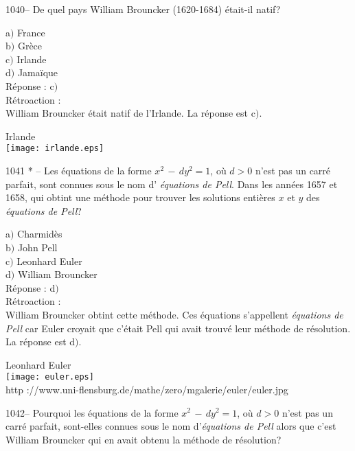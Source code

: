 ﻿\documentclass[letterpaper, 12pt]{article}
\begin{document}
1040-- De quel pays William Brouncker (1620-1684) \'etait-il natif?

a$)$ France  \\
b$)$ Gr\`ece  \\
c$)$ Irlande \\
d$)$ Jama\"ique\\

R\'eponse : c$)$\\

R\'etroaction : \\
William Brouncker \'etait natif de l'Irlande.
La r\'eponse est c$)$.\\
        \begin{center}
        Irlande\\
    \texttt{[image: irlande.eps]}\\
    \end{center}

1041 * -- Les \'equations de la forme $x^2\,-\,dy^2=1$, o\`u $d>0$
n'est pas un carr\'e parfait, sont connues sous le nom d'{\sl
\'equations de Pell}. Dans les ann\'ees 1657 et 1658, qui obtint une
m\'ethode pour trouver les solutions enti\`eres $x$ et $y$ des {\sl
\'equations de Pell}?

a$)$ Charmid\`es \\
b$)$ John Pell \\
c$)$ Leonhard Euler  \\
d$)$ William Brouncker\\

R\'eponse : d$)$\\

R\'etroaction : \\
William Brouncker obtint cette m\'ethode. Ces \'equations
s'appellent {\sl \'equations de Pell} car Euler croyait que
c'\'etait Pell qui avait trouv\'e leur m\'ethode de r\'esolution.
La r\'eponse est d$)$.\\

        \begin{center}
        Leonhard Euler\\
    \texttt{[image: euler.eps]}\\
        {\footnotesize http
://www.uni-flensburg.de/mathe/zero/mgalerie/euler/euler.jpg}
    \end{center}

1042-- Pourquoi les \'equations de la forme $x^2\,-\,dy^2=1$, o\`u
$d>0$ n'est pas un carr\'e parfait, sont-elles connues sous le nom
d'{\sl \'equations de Pell} alors que c'est William Brouncker qui en
avait obtenu la m\'ethode de r\'esolution?
\end{document}
